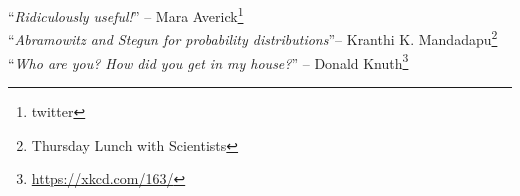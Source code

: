 \normalstretch
\newpage ~\newpage

~\\

\noindent
``\emph{Ridiculously useful!}'' -- Mara Averick\footnote{twitter}%
\\


\noindent
``\emph{Abramowitz and Stegun for probability distributions}''-- Kranthi K. Mandadapu\footnote{Thursday Lunch with Scientists}
\\




\noindent
``\emph{Who are you? How did you get in my house?}'' -- Donald Knuth\footnote{\url{https://xkcd.com/163/}}
\\

